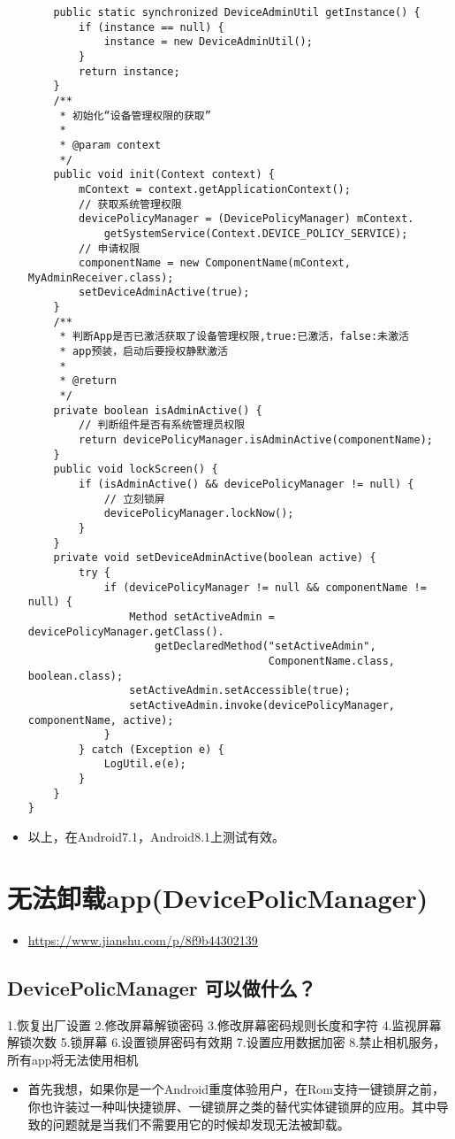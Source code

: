 \documentclass[9pt, b5paper]{article}
\begin{document}
\begin{itemize}
\begin{verbatim}
    public static synchronized DeviceAdminUtil getInstance() {
        if (instance == null) {
            instance = new DeviceAdminUtil();
        }
        return instance;
    }
    /**
     * 初始化“设备管理权限的获取”
     *
     * @param context
     */
    public void init(Context context) {
        mContext = context.getApplicationContext();
        // 获取系统管理权限
        devicePolicyManager = (DevicePolicyManager) mContext.
            getSystemService(Context.DEVICE_POLICY_SERVICE);
        // 申请权限
        componentName = new ComponentName(mContext, MyAdminReceiver.class);
        setDeviceAdminActive(true);
    }
    /**
     * 判断App是否已激活获取了设备管理权限,true:已激活，false:未激活
     * app预装，启动后要授权静默激活
     *
     * @return
     */
    private boolean isAdminActive() {
        // 判断组件是否有系统管理员权限
        return devicePolicyManager.isAdminActive(componentName);
    }
    public void lockScreen() {
        if (isAdminActive() && devicePolicyManager != null) {
            // 立刻锁屏
            devicePolicyManager.lockNow();
        }
    }
    private void setDeviceAdminActive(boolean active) {
        try {
            if (devicePolicyManager != null && componentName != null) {
                Method setActiveAdmin = devicePolicyManager.getClass().
                    getDeclaredMethod("setActiveAdmin", 
                                      ComponentName.class, boolean.class);
                setActiveAdmin.setAccessible(true);
                setActiveAdmin.invoke(devicePolicyManager, componentName, active);
            }
        } catch (Exception e) {
            LogUtil.e(e);
        }
    }
}
\end{verbatim}
\item 以上，在Android7.1，Android8.1上测试有效。
\end{itemize}

\section{无法卸载app(DevicePolicManager)}
\label{sec-2}
\begin{itemize}
\item \url{https://www.jianshu.com/p/8f9b44302139}
\end{itemize}
\subsection{DevicePolicManager 可以做什么？}
\label{sec-2-1}
1.恢复出厂设置
2.修改屏幕解锁密码
3.修改屏幕密码规则长度和字符
4.监视屏幕解锁次数
5.锁屏幕
6.设置锁屏密码有效期
7.设置应用数据加密
8.禁止相机服务，所有app将无法使用相机
\begin{itemize}
\item 首先我想，如果你是一个Android重度体验用户，在Rom支持一键锁屏之前，你也许装过一种叫快捷锁屏、一键锁屏之类的替代实体键锁屏的应用。其中导致的问题就是当我们不需要用它的时候却发现无法被卸载。
\end{itemize}
\end{document}
